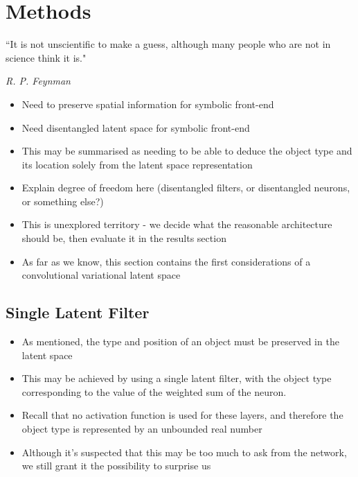\chapter{Methods}

\epigraph{``It is not unscientific to make a guess, although many people who are not in science think it is."}{\textit{R. P. Feynman}}


\begin{itemize}
\item Need to preserve spatial information for symbolic front-end
\item Need disentangled latent space for symbolic front-end
\item This may be summarised as needing to be able to deduce the object type and its location solely from the latent space representation
\item Explain degree of freedom here (disentangled filters, or disentangled neurons, or something else?)
\item This is unexplored territory - we decide what the reasonable architecture should be, then evaluate it in the results section
\item As far as we know, this section contains the first considerations of a convolutional variational latent space
\end{itemize}

\label{ch:methods}


%
%
%
%
%
\section{Single Latent Filter}

\begin{itemize}
\item As mentioned, the type and position of an object must be preserved in the latent space
\item This may be achieved by using a single latent filter, with the object type corresponding to the value of the weighted sum of the neuron.
\item Recall that no activation function is used for these layers, and therefore the object type is represented by an unbounded real number
\item Although it's suspected that this may be too much to ask from the network, we still grant it the possibility to surprise us
\end{itemize}

%
%
